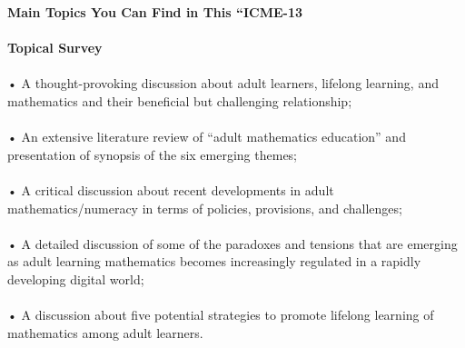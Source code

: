 \documentclass{article}
\begin{document}


\textbf { Main Topics You Can Find in This “ICME-13 }
\textit{\\\\}
\textbf { Topical Survey }
\textit{\\\\}
 • A thought-provoking discussion about adult learners, lifelong learning, and
 mathematics and their beneficial but challenging relationship;
 \textit{\\\\}
 • An extensive literature review of “adult mathematics education” and presentation
 of synopsis of the six emerging themes;
 \textit{\\\\}
 • A critical discussion about recent developments in adult mathematics/numeracy
 in terms of policies, provisions, and challenges;
 \textit{\\\\}
 • A detailed discussion of some of the paradoxes and tensions that are emerging as
 adult learning mathematics becomes increasingly regulated in a rapidly developing
 digital world;
 \textit{\\\\}
 • A discussion about five potential strategies to promote lifelong learning of
 mathematics among adult learners.
 \textit{\\\\}
\end{document}
